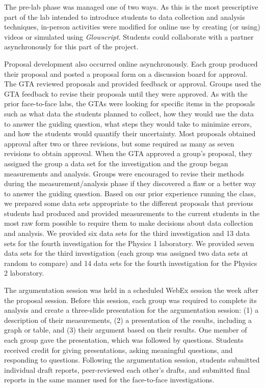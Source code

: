 \documentclass[aip, numerical, preprint]{revtex4-2}
\begin{document}
The pre-lab phase was managed one of two ways.  As this is the most prescriptive part of the
lab intended to introduce students to data collection and analysis techniques, in-person
activities were modified for online use by creating (or using) videos or simulated using
\emph{Glowscript}.\citep{glowscript} Students could collaborate with a partner asynchronously
for this part of the project.

Proposal development also occurred online asynchronously.  Each group produced their proposal
and posted a proposal form on a discussion board for approval. The GTA reviewed proposals and
provided feedback or approval. Groups used the GTA feedback to revise their proposals until
they were approved. As with the prior face-to-face labs, the GTAs were looking for specific
items in the proposals such as what data the students planned to collect, how they would use
the data to answer the guiding question, what steps they would take to minimize errors, and how
the students would quantify their uncertainty. Most proposals obtained approval after two or
three revisions, but some required as many as seven revisions to obtain approval. When the GTA
approved a group's proposal, they assigned the group a data set for the investigation and the
group began measurements and analysis. Groups were encouraged to revise their methods during
the measurement/analysis phase if they discovered a flaw or a better way to answer the guiding
question.  Based on our prior experience running the class, we prepared some data sets
appropriate to the different proposals that previous students had produced and provided
measurements to the current students in the most raw form possible to require them to make
decisions about data collection and analysis. We provided six data sets for the third
investigation and 13 data sets for the fourth investigation for the Physics 1 laboratory. We
provided seven data sets for the third investigation (each group was assigned two data sets at
random to compare) and 14 data sets for the fourth investigation for the Physics 2 laboratory.

The argumentation session was held in a scheduled WebEx session the week after the proposal
session. Before this session, each group was required to complete its analysis and create a
three-slide presentation for the argumentation session: (1) a description of their
measurements, (2) a presentation of the results, including a graph or table, and (3) their
argument based on their results.  One member of each group gave the presentation, which was
followed by questions. Students received credit for giving presentations, asking meaningful
questions, and responding to questions.  Following the argumentation session, students
submitted individual draft reports, peer-reviewed each other's drafts, and submitted final
reports in the same manner used for the face-to-face investigations.
\end{document}
